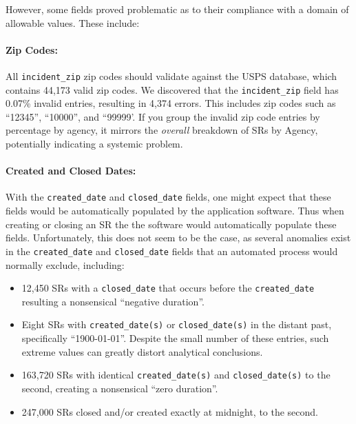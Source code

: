 \documentclass[linenumber]{jdsart}
\begin{document}
However,  some fields proved problematic as to their 
compliance with a domain of allowable values. These include: 

\paragraph{Zip Codes:}
\label{sec:zipcodesissues}
All \texttt{incident\_zip} zip codes should 
validate against the USPS database, which contains 
44,173 valid zip codes. We discovered that the \texttt{incident\_zip} 
field has 0.07\% invalid entries, resulting in 4,374 errors. This includes
zip codes such as ``12345'', ``10000'', and ``99999'. If you group 
the invalid zip code entries by percentage by agency, it 
mirrors the \textit{overall} breakdown of SRs by Agency, potentially 
indicating a systemic problem.


\paragraph{Created and Closed Dates:}
\label{sec:negativeduration}
With the \texttt{created\_date} and \texttt{closed\_date} fields, one 
might expect that these fields would be automatically populated by the  
application software. Thus when creating  or closing an SR 
the the software would automatically populate these fields. 
Unfortunately, this does not seem to be the case, as several anomalies 
exist in the \texttt{created\_date} and \texttt{closed\_date} fields that
an automated process would normally exclude, including:

\begin{itemize}[left=1.5em]
    \item 12,450 SRs with a \texttt{closed\_date} that occurs before the 
    \texttt{created\_date} resulting a nonsensical ``negative duration''. 
    \item Eight SRs with \texttt{created\_date(s)} or \texttt{closed\_date(s)} in 
    the distant past, specifically ``1900-01-01''. Despite the small number of 
    these entries, such extreme values can greatly distort analytical conclusions.
    \item 163,720 SRs with identical \texttt{created\_date(s)} and \texttt{closed\_date(s)} 
    to the second, creating a nonsensical ``zero duration''. 
    \item 247,000 SRs closed and/or created exactly at midnight, to the second.
\end{itemize}
\end{document}
